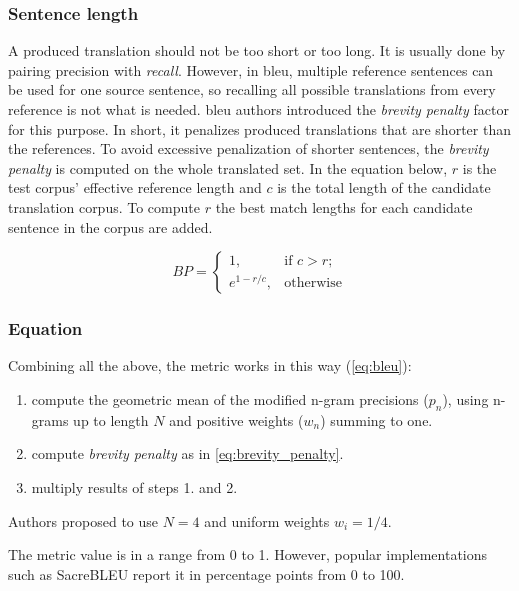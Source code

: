 \subsubsection*{Sentence length}

A produced translation should not be too short or too long.
It is usually done by pairing precision with \textit{recall}.
However, in \acrshort{bleu}, multiple reference sentences can be used
for one source sentence, so recalling all possible translations from
every reference is not what is needed.
\acrshort{bleu} authors introduced the \textit{brevity penalty} factor
for this purpose.
In short, it penalizes produced translations that are shorter than the references.
To avoid excessive penalization of shorter sentences,
the \textit{brevity penalty} is computed on the whole translated set.
In the equation below, $r$ is the test corpus’ effective reference length
and $c$ is the total length of the candidate translation corpus.
To compute $r$ the best match lengths for each candidate sentence
in the corpus are added.

\begin{equation}
\label{eq:brevity_penalty}
    BP=
    \begin{cases}
		1,           & \text{if } c > r;\\
		e^{1-r/c}, & \text{otherwise}
    \end{cases}
\end{equation}

\subsubsection*{Equation}

Combining all the above, the metric works in this way (\cref{eq:bleu}):
\begin{enumerate}
	\item compute the geometric mean of the modified
		n-gram precisions ($p_n$), using n-grams up to length $N$
		and positive weights ($w_n$) summing to one.
	\item compute \textit{brevity penalty} as in \cref{eq:brevity_penalty}.
	\item multiply results of steps 1. and 2.
\end{enumerate}
Authors proposed to use $N=4$ and uniform weights $w_i = 1/4$.

The metric value is in a range from 0 to 1.
However, popular implementations such as SacreBLEU \citep{Post2018-sacrebleu}
report it in percentage points from 0 to 100.



